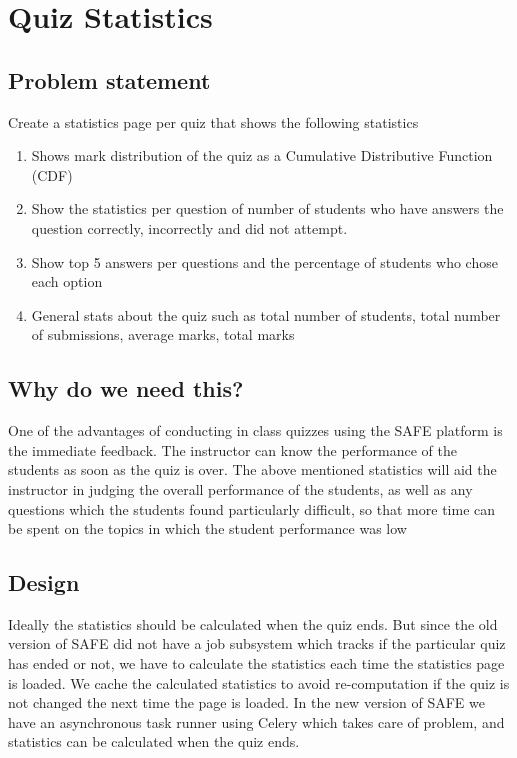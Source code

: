 \clearpage
\section{Quiz Statistics} 
\hspace{0.5cm} 
    
   
\subsection{Problem statement}
	Create a statistics page per quiz that shows the following statistics
	\begin{enumerate}
	    \item Shows mark distribution of the quiz as a Cumulative Distributive Function (CDF)
	    \item Show the statistics per question of number of students who have answers the question correctly, incorrectly and did not attempt.
		\item Show top 5 answers per questions and the percentage of students who chose each option
		\item General stats about the quiz such as total number of students, total number of submissions, average marks, total marks
	\end{enumerate}

\subsection{Why do we need this?}
	One of the advantages of conducting in class quizzes using the SAFE platform is the immediate feedback. The instructor can know the performance of the students as soon as the quiz is over. The above mentioned statistics will aid the instructor in judging the overall performance of the students, as well as any questions which the students found particularly difficult, so that more time can be spent on the topics in which the student performance was low 

\subsection{Design}
	Ideally the statistics should be calculated when the quiz ends. But since the old version of SAFE did not have a job subsystem which tracks if the particular quiz has ended or not, we have to calculate the statistics each time the statistics page is loaded. We cache the calculated statistics to avoid re-computation if the quiz is not changed the next time the page is loaded. In the new version of SAFE we have an asynchronous task runner using Celery which takes care of problem, and statistics can be calculated when the quiz ends.

